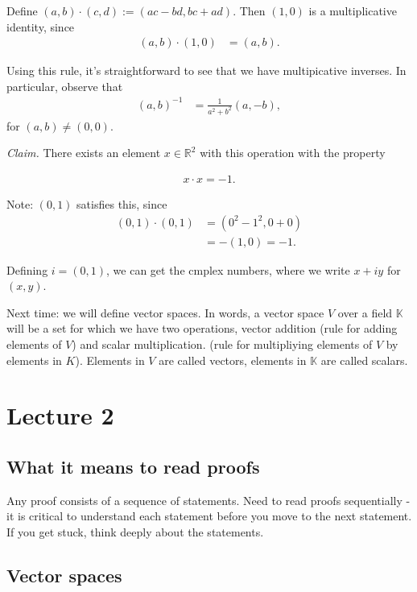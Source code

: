 \documentclass[12pt]{article}
\newcommand{\RR}{\mathbb{R}}
\def\KK{\mathbb{K}}
\begin{document}
Define $(a, b) \cdot (c, d) := (ac - bd, bc + ad)$.  Then $(1, 0)$ is a multiplicative identity, since
\begin{align*}
  (a, b) \cdot (1, 0) &= (a , b).
\end{align*}

Using this rule, it's straightforward to see that we have multipicative inverses.  In particular, observe that
\begin{align*}
  (a, b)^{-1} &= \frac{1}{a^2+b^2} (a, -b),
\end{align*}
for $(a, b) \neq (0, 0)$.

{\it Claim.} There exists an element $x \in \RR^2$ with this operation with the property

\begin{align*}
  x \cdot x = -1.
\end{align*}

Note: $(0, 1)$ satisfies this, since
\begin{align*}
  (0, 1)\cdot (0, 1) &= (0^2 - 1^2, 0 + 0) \\
  &= -(1, 0) = -1.
\end{align*}

Defining $i = (0, 1)$, we can get the cmplex numbers, where we write $x+iy$ for $(x, y)$.

Next time: we will define vector spaces.  In words, a vector space $V$ over a field $\mathbb{K}$ will be a set for which we have two operations, vector addition (rule for adding elements of $V$) and scalar multiplication. (rule for multipliying elements of $V$ by elements in $K$).  Elements in $V$ are called vectors, elements in $\KK$ are called scalars.

\section{Lecture 2}

\subsection{What it means to read proofs}

Any proof consists of a sequence of statements.  Need to read proofs sequentially - it is critical to understand each statement before you move to the next statement.  If you get stuck, think deeply about the statements.

\subsection{Vector spaces}
\end{document}
